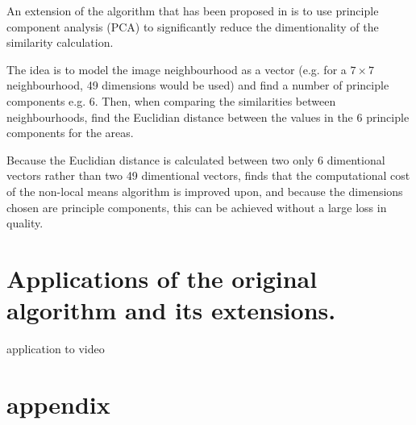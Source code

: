 \documentclass[11pt]{article}
\begin{document}
An extension of the algorithm that has been proposed in \cite{Tasdizen_2008} is to use principle component analysis (PCA) to significantly reduce the dimentionality of the similarity calculation.

The idea is to model the image neighbourhood as a vector (e.g. for a $7 \times 7$ neighbourhood, 49 dimensions would be used) and find a number of principle components e.g. 6. Then, when comparing the similarities between neighbourhoods, find the Euclidian distance between the values in the 6 principle components for the areas. 

Because the Euclidian distance is calculated between two only 6 dimentional vectors rather than two 49 dimentional vectors, \cite{Tasdizen_2008} finds that the computational cost of the non-local means algorithm is improved upon, and because the dimensions chosen are principle components, this can be achieved without a large loss in quality.

\section{Applications of the original algorithm and its extensions. }


application to video



\pagebreak
\section{appendix}
\end{document}
